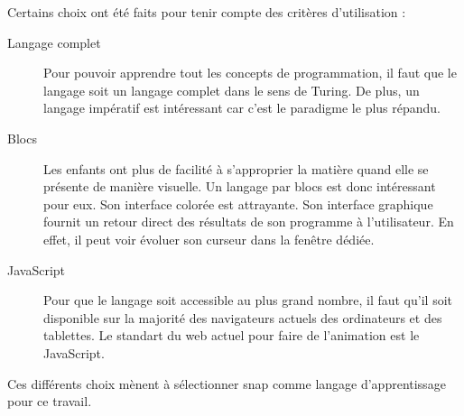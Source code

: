 Certains choix ont été faits pour tenir compte des critères d'utilisation :
\begin{description}
  \item[Langage complet] Pour pouvoir apprendre tout les concepts de programmation, il faut que le langage soit un langage complet dans le sens de Turing.  De plus, un langage impératif est intéressant car c'est le paradigme le plus répandu.
  \item[Blocs] Les enfants ont plus de facilité à s'approprier la matière quand elle se présente de manière visuelle. %
  Un langage par \glspl{bloc} est donc intéressant pour eux. Son interface colorée est attrayante. Son interface graphique fournit un retour direct des résultats de son programme à l'utilisateur. En effet, il peut voir évoluer son curseur dans la fenêtre dédiée.
  \item[JavaScript] Pour que le langage soit accessible au plus grand nombre, il faut qu'il soit disponible sur la majorité des navigateurs actuels des ordinateurs et des tablettes. Le standart du web actuel pour faire de l'animation est le JavaScript.
\end{description}
Ces différents choix mènent à sélectionner \gls{snap} comme langage d'apprentissage pour ce travail.

